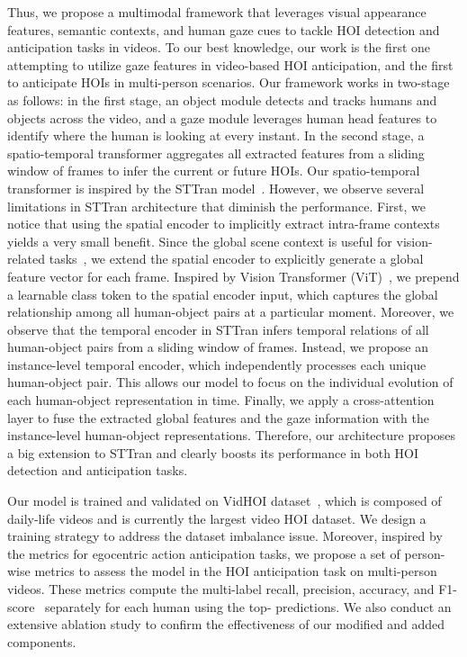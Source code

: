\documentclass[times,twocolumn,final,authoryear]{elsarticle}
\begin{document}
Thus, we propose a multimodal framework that leverages visual appearance features, semantic contexts, and human gaze cues to tackle HOI detection and anticipation tasks in videos. To our best knowledge, our work is the first one attempting to utilize gaze features in video-based HOI anticipation, and the first to anticipate HOIs in multi-person scenarios. Our framework works in two-stage as follows: in the first stage, an object module detects and tracks humans and objects across the video, and a gaze module leverages human head features to identify where the human is looking at every instant. In the second stage, a spatio-temporal transformer aggregates all extracted features from a sliding window of frames to infer the current or future HOIs. Our spatio-temporal transformer is inspired by the STTran model~\citep{hoi_v2:sttran}. However, we observe several limitations in STTran architecture that diminish the performance. First, we notice that using the spatial encoder to implicitly extract intra-frame contexts yields a very small benefit. Since the global scene context is useful for vision-related tasks~\citep{hoi_i2:deep_contextual, detection:global_context_aware, detection:reasonable_global_context}, we extend the spatial encoder to explicitly generate a global feature vector for each frame. Inspired by Vision Transformer (ViT)~\citep{transformer:vit}, we prepend a learnable class token to the spatial encoder input, which captures the global relationship among all human-object pairs at a particular moment. Moreover, we observe that the temporal encoder in STTran infers temporal relations of all human-object pairs from a sliding window of frames. Instead, we propose an instance-level temporal encoder, which independently processes each unique human-object pair. This allows our model to focus on the individual evolution of each human-object representation in time. Finally, we apply a cross-attention layer to fuse the extracted global features and the gaze information with the instance-level human-object representations. Therefore, our architecture proposes a big extension to STTran and clearly boosts its performance in both HOI detection and anticipation tasks.

Our model is trained and validated on VidHOI dataset~\citep{hoi_v_set:VidHOI}, which is composed of daily-life videos and is currently the largest video HOI dataset. We design a training strategy to address the dataset imbalance issue. Moreover, inspired by the metrics for egocentric action anticipation tasks, we propose a set of person-wise metrics to assess the model in the HOI anticipation task on multi-person videos. These metrics compute the multi-label recall, precision, accuracy, and F1-score~\citep{metric:multi_label} separately for each human using the top- predictions. We also conduct an extensive ablation study to confirm the effectiveness of our modified and added components. 
\end{document}
